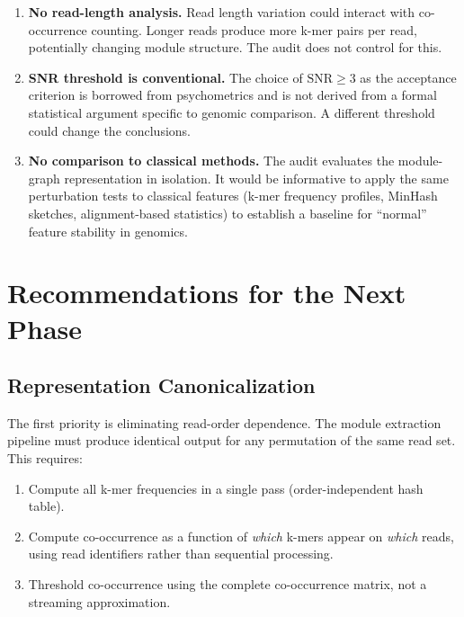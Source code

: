 \documentclass{../yalumba}
\begin{document}
\begin{enumerate}
  \item \textbf{No read-length analysis.}  Read length variation could
    interact with co-occurrence counting.  Longer reads produce more
    k-mer pairs per read, potentially changing module structure.  The
    audit does not control for this.

  \item \textbf{SNR threshold is conventional.}  The choice of
    $\text{SNR} \geq 3$ as the acceptance criterion is borrowed from
    psychometrics and is not derived from a formal statistical
    argument specific to genomic comparison.  A different threshold
    could change the conclusions.

  \item \textbf{No comparison to classical methods.}  The audit
    evaluates the module-graph representation in isolation.  It would
    be informative to apply the same perturbation tests to classical
    features (k-mer frequency profiles, MinHash sketches, alignment-based
    statistics) to establish a baseline for ``normal'' feature stability
    in genomics.
\end{enumerate}


\section{Recommendations for the Next Phase}
\label{sec:recommendations}

\subsection{Representation Canonicalization}
\label{sec:rec-canonical}

The first priority is eliminating read-order dependence.  The module
extraction pipeline must produce identical output for any permutation
of the same read set.  This requires:

\begin{enumerate}
  \item Compute all k-mer frequencies in a single pass (order-independent
    hash table).
  \item Compute co-occurrence as a function of \emph{which} k-mers
    appear on \emph{which} reads, using read identifiers rather than
    sequential processing.
  \item Threshold co-occurrence using the complete co-occurrence matrix,
    not a streaming approximation.
\end{enumerate}
\end{document}
